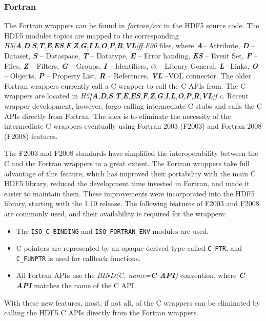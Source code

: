 \subsubsection{Fortran\label{subsec:Fortran}}

The Fortran wrappers can be found in \textit{fortran/src} in the HDF5 source code. The HDF5 modules topics are mapped to the corresponding
\emph{H5{[}}\textbf{\textsl{A}},\textbf{\textsl{D}},\textbf{\textsl{S}},\textbf{\textsl{T}},\textbf{\textsl{E}},\textbf{\textsl{ES}},\textbf{\textsl{F}},\textbf{\textsl{Z}},\textbf{\textsl{G}},\textbf{\textsl{I}},\textbf{\textsl{L}},\textbf{\textsl{O}},\textbf{\textsl{P}},\textbf{\textsl{R}},\textbf{\textsl{VL}}\emph{{]}ff.F90} files, where \textbf{\textsl{A}}-- Attribute, \textbf{\textsl{D}} -- Dataset, \textbf{\textsl{S}} -- Dataspace, \textbf{\textsl{T}}
-- Datatype, \textbf{\textsl{E}} -- Error handing, \textbf{\textsl{ES}} -- Event Set, \textbf{\textsl{F}} -- Files, \textbf{\textsl{Z}} -- Filters, \textbf{\textsl{G}} -- Groups, \textbf{\textsl{I}} -- Identifiers,  $\varnothing$ -- Library General, \textbf{\textsl{L}} --Links, \textbf{\textsl{O}} -- Objects, \textbf{\textsl{P}} -- Property
List, \textbf{\textsl{R}} -- References, \textbf{\textsl{VL}} --VOL connector. The older Fortran wrappers currently call a C wrapper
to call the C APIs from. The C wrappers are located in \emph{H5}\textbf{\textsl{{[}A}},\textbf{\textsl{D}},\textbf{\textsl{S}},\textbf{\textsl{T}},\textbf{\textsl{E}},\textbf{\textsl{ES}},\textbf{\textsl{F}},\textbf{\textsl{Z}},\textbf{\textsl{G}},\textbf{\textsl{I}},\textbf{\textsl{L}},\textbf{\textsl{O}},\textbf{\textsl{P}},\textbf{\textsl{R}},\textbf{\textsl{VL}}\emph{{]}f.c}.
Recent wrapper development, however, forgo calling intermediate C stubs and calls the C APIs directly from Fortran. The idea is to eliminate the necessity of the intermediate C wrappers eventually using Fortran 2003 (F2003) and Fortran 2008 (F2008) features.

The F2003 and F2008 standards have simplified the interoperability between the C and the Fortran wrappers to a great extent. The Fortran wrappers take full advantage of this feature, which has improved their portability with the main C HDF5 library, reduced the development time invested in Fortran, and made it easier to maintain them. These improvements were incorporated into the HDF5 library, starting with the 1.10 release.
The following features of F2003 and F2008 are commonly used, and their availability is required for the wrappers:
\begin{itemize}
    \item The \texttt{ISO\_C\_BINDING} and \texttt{ISO\_FORTRAN\_ENV} modules are used.
    \item C pointers are represented by an opaque derived type called \texttt{C\_PTR}, and \texttt{C\_FUNPTR} is used for callback functions.
    \item All Fortran APIs use the \textit{BIND(C, name=\textbf{C API})} convention, where \textit{\textbf{C API}} matches the name of the C API.
\end{itemize}
With these new features, most, if not all, of the C wrappers can be eliminated by calling the HDF5 C APIs directly from the Fortran wrappers. 

